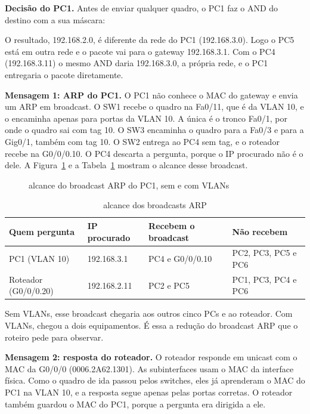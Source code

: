 \textbf{Decisão do PC1.} Antes de enviar qualquer quadro, o PC1 faz o AND do destino com a sua máscara:



O resultado, 192.168.2.0, é diferente da rede do PC1 (192.168.3.0). Logo o PC5 está em outra rede e o pacote vai para o gateway 192.168.3.1. Com o PC4 (192.168.3.11) o mesmo AND daria 192.168.3.0, a própria rede, e o PC1 entregaria o pacote diretamente.

\textbf{Mensagem 1: ARP do PC1.} O PC1 não conhece o MAC do gateway e envia um ARP em broadcast. O SW1 recebe o quadro na Fa0/11, que é da VLAN 10, e o encaminha apenas para portas da VLAN 10. A única é o tronco Fa0/1, por onde o quadro sai com tag 10. O SW3 encaminha o quadro para a Fa0/3 e para a Gig0/1, também com tag 10. O SW2 entrega ao PC4 sem tag, e o roteador recebe na G0/0/0.10. O PC4 descarta a pergunta, porque o IP procurado não é o dele. A Figura~\ref{fig:alcance} e a Tabela~\ref{tab:arp} mostram o alcance desse broadcast.

\begin{figure}[tbp]
\captionsetup{position=top}
\caption{alcance do broadcast ARP do PC1, sem e com VLANs}\label{fig:alcance}
\centering
\resizebox{\textwidth}{!}{}
\fonte
\end{figure}

\begin{table}[H]
\caption{alcance dos broadcasts ARP}\label{tab:arp}
\small\renewcommand{\arraystretch}{1.2}
\begin{tabularx}{\textwidth}{@{}lll>{\raggedright\arraybackslash}X@{}}
\toprule
\textbf{Quem pergunta} & \textbf{IP procurado} & \textbf{Recebem o broadcast} & \textbf{Não recebem}\\
\midrule
PC1 (VLAN 10) & 192.168.3.1 & PC4 e G0/0/0.10 & PC2, PC3, PC5 e PC6\\
Roteador (G0/0/0.20) & 192.168.2.11 & PC2 e PC5 & PC1, PC3, PC4 e PC6\\
\bottomrule
\end{tabularx}
\fonte
\end{table}

Sem VLANs, esse broadcast chegaria aos outros cinco PCs e ao roteador. Com VLANs, chegou a dois equipamentos. É essa a redução do broadcast ARP que o roteiro pede para observar.

\textbf{Mensagem 2: resposta do roteador.} O roteador responde em unicast com o MAC da G0/0/0 (0006.2A62.1301). As subinterfaces usam o MAC da interface física. Como o quadro de ida passou pelos switches, eles já aprenderam o MAC do PC1 na VLAN 10, e a resposta segue apenas pelas portas corretas. O roteador também guardou o MAC do PC1, porque a pergunta era dirigida a ele.

